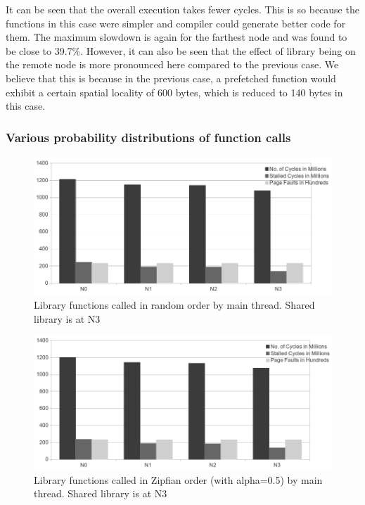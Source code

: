 It can be seen that the overall execution takes fewer cycles.
This is so because the functions in this case were simpler and compiler could generate better code for them.
The maximum slowdown is again for the farthest node and was found to be close to 39.7\%.
However, it can also be seen that the effect of library being on the remote node is more pronounced here compared to the previous case.
We believe that this is because in the previous case, a prefetched function would exhibit a certain spatial locality of 600 bytes,
which is reduced to 140 bytes in this case.

\subsubsection{Various probability distributions of function calls}

\begin{figure}
    \centering
    \includegraphics[scale=0.38]{randomDistribution.png}
    \caption{Library functions called in random order by main thread. Shared library is at N3 }
    \label{fig:randomDistribution}
\end{figure}

\begin{figure}
    \centering
    \includegraphics[scale=0.38]{zipfDistribution.png}
    \caption{Library functions called in Zipfian order (with alpha=0.5) by main thread. Shared library is at N3 }
    \label{fig:zipfDistribution}
\end{figure}

